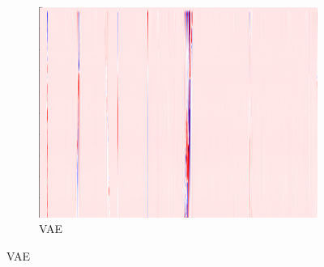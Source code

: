 \begin{figure}[!h]
\begin{subfigure}{0.33\textwidth}
        \includegraphics[width=\textwidth]{figures/test.png}
        \caption{VAE}
    \end{subfigure}
    
    \vspace{1em}
    

\end{figure}
